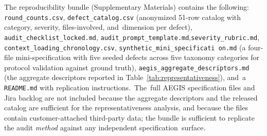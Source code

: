 \documentclass[software,article,accept,pdftex,oneauthor]{Definitions/mdpi}
\begin{document}
{\sloppy The reproducibility bundle (Supplementary Materials) contains the following: \texttt{round\_counts.csv}, \texttt{defect\_catalog.csv} (anonymized 51-row catalog with category, severity, files-involved, and~dimension per defect), \texttt{audit\_\allowbreak checklist\_\allowbreak locked.md}, \texttt{audit\_\allowbreak prompt\_\allowbreak template.md},\linebreak   \texttt{severity\_rubric.md}, \texttt{context\_\allowbreak loading\_\allowbreak chronology.csv}, \texttt{synthetic\_mini\_specificati}\linebreak \texttt{ on.md} (a four-file mini-specification with five seeded defects across five taxonomy categories for protocol validation against ground truth), \texttt{aegis\_\allowbreak aggregate\_\allowbreak descriptors.md} (the aggregate descriptors reported in Table~\ref{tab:representativeness}), and~a \texttt{README.md} with replication instructions.~The~full AEGIS specification files and Jira backlog are not included because the aggregate descriptors and the released catalog are sufficient for the representativeness analysis, and because the files contain customer-attached third-party data; the bundle is sufficient to replicate the audit \emph{method} against any independent specification~surface.\par}
\end{document}
